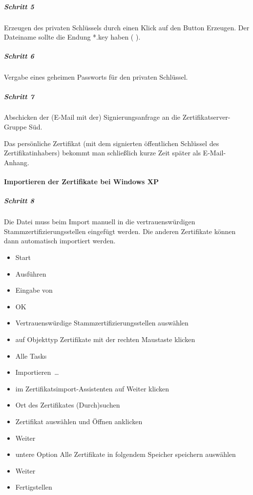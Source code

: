 \subparagraph{Schritt 5}

Erzeugen des privaten Schlüssels durch einen Klick auf den Button \glqq{}Erzeugen\grqq{}.
Der Dateiname sollte die Endung *.key haben (\zB{}  ).

\subparagraph{Schritt 6}

Vergabe eines geheimen Passworts für den privaten Schlüssel.

\subparagraph{Schritt 7}

Abschicken der (E-Mail mit der) Signierungsanfrage an die
Zertifikatserver\hyp Gruppe Süd.

Das persönliche Zertifikat (mit dem signierten öffentlichen Schlüssel des
Zertifikatinhabers) bekommt man schließlich kurze Zeit später als E-Mail-Anhang.

\paragraph{Importieren der Zertifikate bei Windows XP}

\subparagraph{Schritt 8}

Die Datei  muss beim Import manuell in die
vertrauenswürdigen Stammzertifizierungsstellen eingefügt werden. Die anderen
Zertifikate können dann automatisch importiert werden.

\begin{itemize}
  \item \glqq{}Start\grqq{}
  \item \glqq{}Ausführen\grqq{}
  \item Eingabe von 
  \item \glqq{}OK\grqq{}
  \item \glqq{}Vertrauenswürdige Stammzertifizierungsstellen\grqq{} auswählen
  \item auf Objekttyp \glqq{}Zertifikate\grqq{} mit der rechten Maustaste klicken
  \item \glqq{}Alle Tasks\grqq{}
  \item \glqq{}Importieren~\dots\grqq{} 
  \item im Zertifikatsimport-Assistenten auf \glqq{}Weiter\grqq{} klicken
  \item Ort des Zertifikates \glqq{}(Durch)suchen\grqq{}
  \item Zertifikat auswählen und \glqq{}Öffnen\grqq{} anklicken
  \item \glqq{}Weiter\grqq{}
  \item untere Option \glqq{}Alle Zertifikate in folgendem Speicher speichern\grqq{} auswählen
  \item \glqq{}Weiter\grqq{}
  \item \glqq{}Fertigstellen\grqq{}
\end{itemize}

